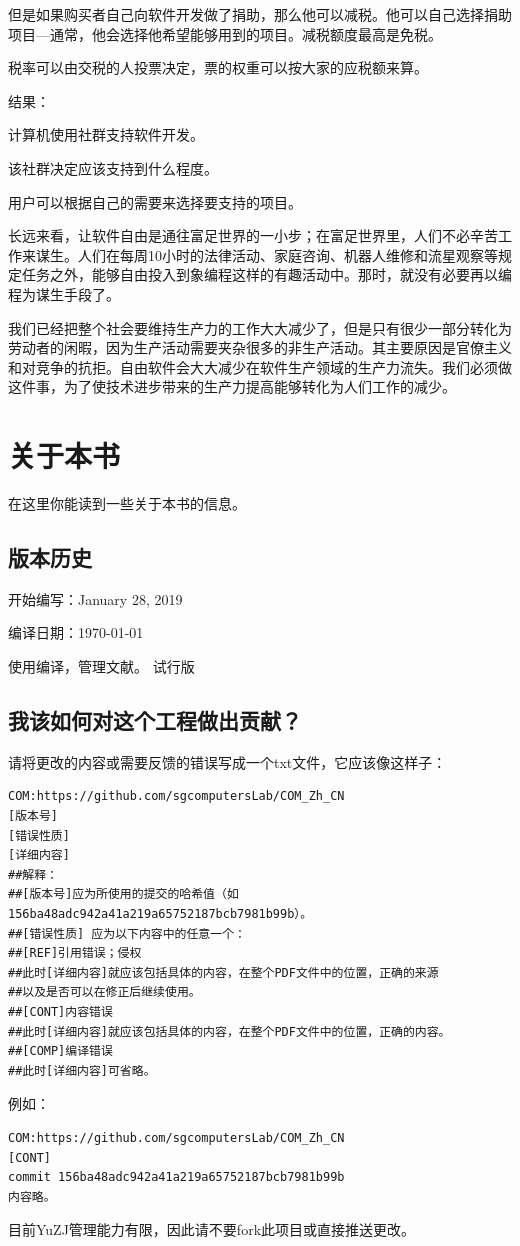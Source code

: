 但是如果购买者自己向软件开发做了捐助，那么他可以减税。他可以自己选择捐助项目—通常，他会选择他希望能够用到的项目。减税额度最高是免税。\par
税率可以由交税的人投票决定，票的权重可以按大家的应税额来算。\par
结果：\par
计算机使用社群支持软件开发。\par
该社群决定应该支持到什么程度。\par
用户可以根据自己的需要来选择要支持的项目。\par
长远来看，让软件自由是通往富足世界的一小步；在富足世界里，人们不必辛苦工作来谋生。人们在每周10小时的法律活动、家庭咨询、机器人维修和流星观察等规定任务之外，能够自由投入到象编程这样的有趣活动中。那时，就没有必要再以编程为谋生手段了。\par
我们已经把整个社会要维持生产力的工作大大减少了，但是只有很少一部分转化为劳动者的闲暇，因为生产活动需要夹杂很多的非生产活动。其主要原因是官僚主义和对竞争的抗拒。自由软件会大大减少在软件生产领域的生产力流失。我们必须做这件事，为了使技术进步带来的生产力提高能够转化为人们工作的减少。
\chapter{关于本书}
在这里你能读到一些关于本书的信息。
\section{版本历史}
开始编写：January 28, 2019\par
编译日期：\today \par
使用\XeLaTeX 编译，\BIBTEX 管理文献。
试行版
\section{我该如何对这个工程做出贡献？}
请将更改的内容或需要反馈的错误写成一个txt文件，它应该像这样子：
\begin{verbatim}
COM:https://github.com/sgcomputersLab/COM_Zh_CN
[版本号]
[错误性质]
[详细内容]
##解释：
##[版本号]应为所使用的提交的哈希值（如156ba48adc942a41a219a65752187bcb7981b99b）。
##[错误性质] 应为以下内容中的任意一个：
##[REF]引用错误；侵权
##此时[详细内容]就应该包括具体的内容，在整个PDF文件中的位置，正确的来源
##以及是否可以在修正后继续使用。
##[CONT]内容错误
##此时[详细内容]就应该包括具体的内容，在整个PDF文件中的位置，正确的内容。
##[COMP]编译错误
##此时[详细内容]可省略。
\end{verbatim} \par
例如：
\begin{verbatim}
COM:https://github.com/sgcomputersLab/COM_Zh_CN
[CONT]
commit 156ba48adc942a41a219a65752187bcb7981b99b
内容略。
\end{verbatim} \par
目前YuZJ管理能力有限，因此请不要fork此项目或直接推送更改。
